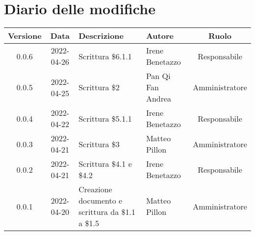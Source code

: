 \section*{Diario delle modifiche}
	\begin{center}
	\renewcommand{\arraystretch}{1.8} %
	\begin{tabular}{ |c|c|m{12em}|m{7em}|c| }
	\hline
	\textbf{Versione} & \textbf{Data} & \textbf{Descrizione} &  \textbf{Autore} &  \textbf{Ruolo} \\ %
	\hline
	0.0.6 & 2022-04-26 & Scrittura \$6.1.1 & Irene Benetazzo & Responsabile\\
	\hline 
	0.0.5& 2022-04-25 & Scrittura \$2 & Pan Qi Fan \newline Andrea & Amministratore\\
	\hline
	0.0.4 & 2022-04-22 & Scrittura \$5.1.1 & Irene Benetazzo & Responsabile\\
	\hline 
	0.0.3 & 2022-04-21 & Scrittura \$3 & Matteo Pillon & Amministratore\\
	\hline
	0.0.2 & 2022-04-21 & Scrittura \$4.1 e \$4.2 & Irene Benetazzo & Responsabile\\
	\hline
    0.0.1 & 2022-04-20 & Creazione documento e scrittura da \$1.1 a \$1.5 & Matteo Pillon & Amministratore\\ %
	\hline
	\end{tabular}
	\end{center}
	\newpage